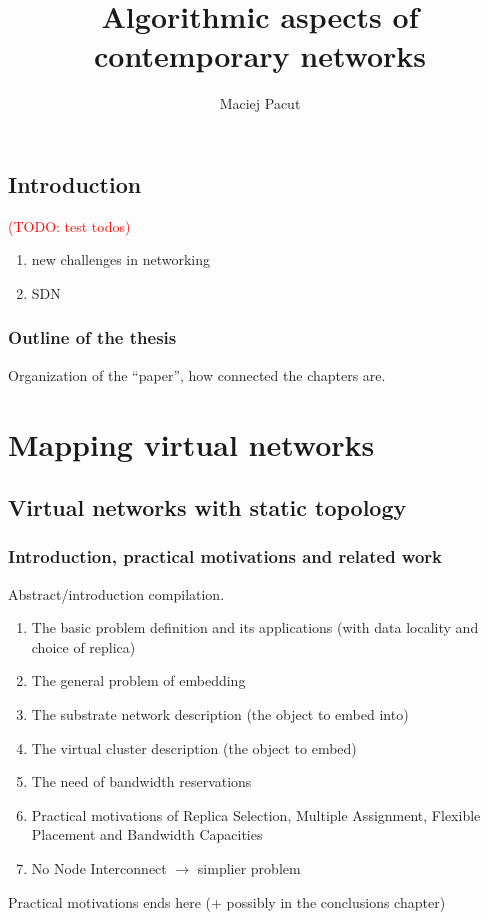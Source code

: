 \documentclass[a4paper]{book}
\title{Algorithmic aspects of contemporary networks}
\author{Maciej Pacut}
\newcommand{\margcomm}[1]{\marginpar{\footnotesize\raggedright #1}}
\newcommand{\todo}[1]{\noindent\textcolor{red}{(TODO: #1)}\margcomm{TODO}}
\begin{document}
\maketitle

\tableofcontents


\chapter{Introduction}

\todo{test todos}


\begin{enumerate}
  \item new challenges in networking \cite{icnp15loc}
  \item SDN
\end{enumerate}

\section{Outline of the thesis}

Organization of the ``paper'', how connected the chapters are.

\part{Mapping virtual networks}

\chapter{Virtual networks with static topology}

\section{Introduction, practical motivations and related work}
Abstract/introduction compilation.
\begin{enumerate}
  \item The basic problem definition and its applications (with data locality and choice of replica)
  \item The general problem of embedding
  \item The substrate network description (the object to embed into)
  \item The virtual cluster description (the object to embed)
  \item The need of bandwidth reservations
  \item Practical motivations of Replica Selection, Multiple Assignment, Flexible Placement and Bandwidth Capacities
  \item No Node Interconnect $\rightarrow$ simplier problem
\end{enumerate}
Practical motivations ends here (+ possibly in the conclusions chapter)
\end{document}
